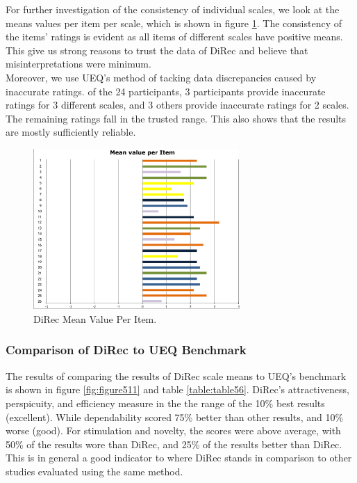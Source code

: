 For further investigation of the consistency of individual scales, we look at
the means values per item per scale, which is shown in figure
\ref{fig:figure510}. The consistency of the items' ratings is evident
as all items of different scales have positive means. This give us strong
reasons to trust the data of DiRec and believe that misinterpretations were
minimum.\\
Moreover, we use UEQ's method of tacking data discrepancies caused by
inaccurate ratings. of the 24 participants, 3 participants provide inaccurate
ratings for 3 different scales, and 3 others provide inaccurate ratings for 2
scales. The remaining ratings fall in the trusted range. This also shows that
the results are mostly sufficiently reliable.
\begin{figure}[!htbp]
\centering
\includegraphics[width=0.7\textwidth]{figures/direc-results3}
\caption{DiRec Mean Value Per Item.}
\label{fig:figure510}
\end{figure}
\subsubsection{Comparison of DiRec to UEQ Benchmark}
The results of comparing the results of DiRec scale means to UEQ's benchmark is
shown in figure \ref{fig:figure511} and table \ref{table:table56}. DiRec's
attractiveness, perspicuity, and efficiency measure in the the range of the 10\%
best results (excellent). While dependability scored 75\% better than other
results, and 10\% worse (good). For stimulation and novelty, the scores were
above average, with 50\% of the results wore than DiRec, and 25\% of the results
better than DiRec. This is in general a good indicator to where DiRec stands in
comparison to other studies evaluated using the same method.

